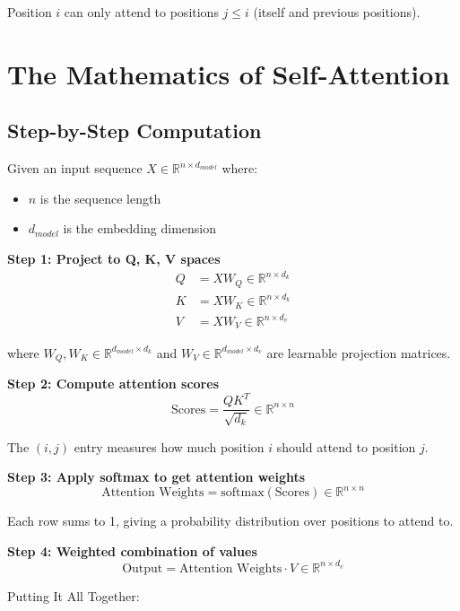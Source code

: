 \documentclass{article}
\begin{document}
Position $i$ can only attend to positions $j \leq i$ (itself and previous positions).




\section{The Mathematics of Self-Attention}

\subsection{Step-by-Step Computation}

Given an input sequence $X \in \mathbb{R}^{n \times d_{model}}$ where:
\begin{itemize}
\item $n$ is the sequence length
\item $d_{model}$ is the embedding dimension
\end{itemize}

\textbf{Step 1: Project to Q, K, V spaces}
\begin{align}
Q &= XW_Q \in \mathbb{R}^{n \times d_k}\\
K &= XW_K \in \mathbb{R}^{n \times d_k}\\
V &= XW_V \in \mathbb{R}^{n \times d_v}
\end{align}

where $W_Q, W_K \in \mathbb{R}^{d_{model} \times d_k}$ and $W_V \in \mathbb{R}^{d_{model} \times d_v}$ are learnable projection matrices.

\textbf{Step 2: Compute attention scores}
\[
\text{Scores} = \frac{QK^T}{\sqrt{d_k}} \in \mathbb{R}^{n \times n}
\]

The $(i,j)$ entry measures how much position $i$ should attend to position $j$.

\textbf{Step 3: Apply softmax to get attention weights}
\[
\text{Attention Weights} = \text{softmax}(\text{Scores}) \in \mathbb{R}^{n \times n}
\]

Each row sums to 1, giving a probability distribution over positions to attend to.

\textbf{Step 4: Weighted combination of values}
\[
\text{Output} = \text{Attention Weights} \cdot V \in \mathbb{R}^{n \times d_v}
\]

Putting It All Together:
\end{document}
